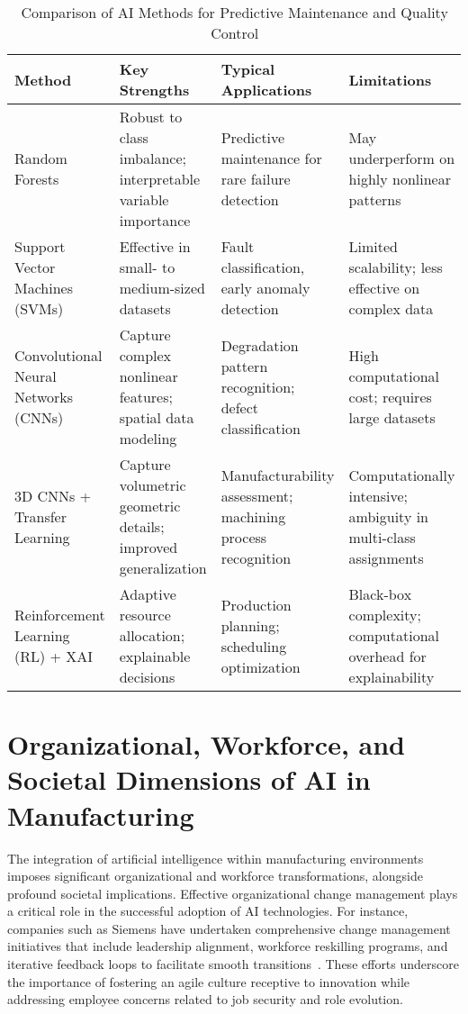\documentclass[sigconf]{acmart}
\begin{document}
\begin{table*}[htbp]
\centering
\caption{Comparison of AI Methods for Predictive Maintenance and Quality Control}
\label{tab:method_comparison}
\begin{adjustbox}{max width=\textwidth}
\begin{tabular}{@{}llll@{}}
\toprule
\textbf{Method} & \textbf{Key Strengths} & \textbf{Typical Applications} & \textbf{Limitations} \\
\toprule
Random Forests & Robust to class imbalance; interpretable variable importance & Predictive maintenance for rare failure detection & May underperform on highly nonlinear patterns \\
Support Vector Machines (SVMs) & Effective in small- to medium-sized datasets & Fault classification, early anomaly detection & Limited scalability; less effective on complex data \\
Convolutional Neural Networks (CNNs) & Capture complex nonlinear features; spatial data modeling & Degradation pattern recognition; defect classification & High computational cost; requires large datasets \\
3D CNNs + Transfer Learning & Capture volumetric geometric details; improved generalization & Manufacturability assessment; machining process recognition & Computationally intensive; ambiguity in multi-class assignments \\
Reinforcement Learning (RL) + XAI & Adaptive resource allocation; explainable decisions & Production planning; scheduling optimization & Black-box complexity; computational overhead for explainability \\
\bottomrule
\end{tabular}
\end{adjustbox}
\end{table*}

\section{Organizational, Workforce, and Societal Dimensions of AI in Manufacturing}

The integration of artificial intelligence within manufacturing environments imposes significant organizational and workforce transformations, alongside profound societal implications. Effective organizational change management plays a critical role in the successful adoption of AI technologies. For instance, companies such as Siemens have undertaken comprehensive change management initiatives that include leadership alignment, workforce reskilling programs, and iterative feedback loops to facilitate smooth transitions~\cite{}. These efforts underscore the importance of fostering an agile culture receptive to innovation while addressing employee concerns related to job security and role evolution.
\end{document}

